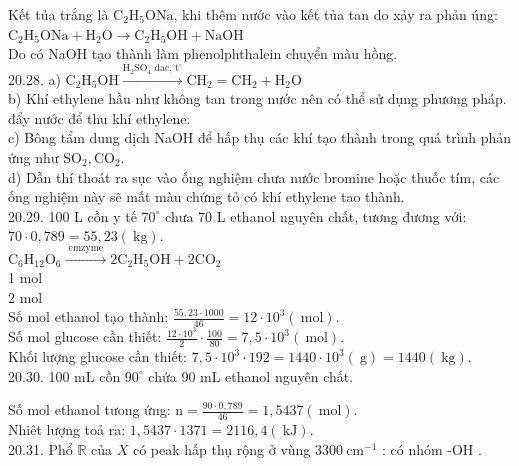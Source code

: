 \documentclass[10pt]{article}
\begin{document}
Kết tủa trắng là $\mathrm{C}_{2} \mathrm{H}_{5} \mathrm{ONa}$, khi thêm nước vào kết tủa tan do xảy ra phản úng:\\
$\mathrm{C}_{2} \mathrm{H}_{5} \mathrm{ONa}+\mathrm{H}_{2} \mathrm{O} \longrightarrow \mathrm{C}_{2} \mathrm{H}_{5} \mathrm{OH}+\mathrm{NaOH}$\\
Do có NaOH tạo thành làm phenolphthalein chuyển màu hồng.\\
20.28. a) $\mathrm{C}_{2} \mathrm{H}_{5} \mathrm{OH} \xrightarrow{\mathrm{H}_{2} \mathrm{SO}_{4} \text { dac, } \mathrm{t}^{\circ}} \mathrm{CH}_{2}=\mathrm{CH}_{2}+\mathrm{H}_{2} \mathrm{O}$\\
b) Khí ethylene hầu như không tan trong nước nên có thể sử dụng phương pháp. đẩy nước để thu khí ethylene.\\
c) Bông tẩm dung dịch NaOH để hấp thụ các khí tạo thành trong quá trình phản ứng như $\mathrm{SO}_{2}, \mathrm{CO}_{2}$.\\
d) Dẫn thí thoát ra sục vào ống nghiệm chưa nước bromine hoặc thuốc tím, các ống nghiệm này sẽ mất màu chứng tỏ có khí ethylene tao thành.\\
20.29. 100 L cồn y tế $70^{\circ}$ chưa 70 L ethanol nguyên chất, tương đương với: $70 \cdot 0,789=55,23(\mathrm{~kg})$.\\
$\mathrm{C}_{6} \mathrm{H}_{12} \mathrm{O}_{6} \xrightarrow{\text { emzyme }} 2 \mathrm{C}_{2} \mathrm{H}_{5} \mathrm{OH}+2 \mathrm{CO}_{2}$\\
1 mol\\
2 mol\\
Số mol ethanol tạo thành: $\frac{55,23 \cdot 1000}{46}=12 \cdot 10^{3}(\mathrm{~mol})$.\\
Số mol glucose cần thiết: $\frac{12 \cdot 10^{3}}{2} \cdot \frac{100}{80}=7,5 \cdot 10^{3}(\mathrm{~mol})$.\\
Khối lượng glucose cần thiết: $7,5 \cdot 10^{3} \cdot 192=1440 \cdot 10^{3}(\mathrm{~g})=1440(\mathrm{~kg})$.\\
20.30. 100 mL cồn $90^{\circ}$ chứa 90 mL ethanol nguyên chất.

Số mol ethanol tưong ứng: $\mathrm{n}=\frac{90 \cdot 0,789}{46}=1,5437(\mathrm{~mol})$.\\
Nhiêt lượng toả ra: $1,5437 \cdot 1371=2116,4(\mathrm{~kJ})$.\\
20.31. Phổ $\mathbb{R}$ của $X$ có peak hấp thụ rộng ở vùng $3300 \mathrm{~cm}^{-1}$ : có nhóm -OH .
\end{document}

